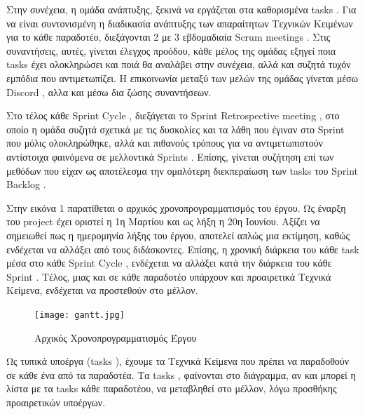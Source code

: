 \documentclass{../ol-softwaremanual}
\begin{document}
	\vspace{5pt}
	
	Στην συνέχεια, η ομάδα ανάπτυξης, ξεκινά να εργάζεται στα καθορισμένα \en tasks \gr .
	Για να είναι συντονισμένη η διαδικασία ανάπτυξης των απαραίτητων Τεχνικών Κειμένων για το κάθε παραδοτέο, διεξάγονται 2 με 3 εβδομαδιαία \en Scrum meetings \gr . Στις συναντήσεις, αυτές, γίνεται έλεγχος προόδου, κάθε μέλος της ομάδας εξηγεί ποια \en tasks \gr έχει ολοκληρώσει και ποιά θα αναλάβει στην συνέχεια, αλλά και συζητά τυχόν εμπόδια που αντιμετωπίζει.
	Η επικοινωνία μεταξύ των μελών της ομάδας γίνεται μέσω \en Discord \gr, αλλα και μέσω δια ζώσης συναντήσεων. \\
	
	\vspace{5pt}
	
	Στο τέλος κάθε \en Sprint Cycle \gr , διεξάγεται το \en Sprint Retrospective meeting \gr , στο οποίο η ομάδα συζητά σχετικά με τις δυσκολίες και τα λάθη που έγιναν στο \en Sprint \gr που μόλις ολοκληρώθηκε, αλλά και πιθανούς τρόπους για να αντιμετωπιστούν αντίστοιχα φαινόμενα σε μελλοντικά \en Sprints \gr . Επίσης, γίνεται συζήτηση επί των μεθόδων που είχαν ως αποτέλεσμα την ομαλότερη διεκπεραίωση των \en tasks \gr του \en Sprint Backlog \gr .
	
	\newpage
	
		
		\flushleft
		
		Στην εικόνα 1 παρατίθεται ο αρχικός χρονοπρογραμματισμός του έργου. Ως έναρξη του \en project \gr έχει οριστεί η 1η Μαρτίου και ως λήξη η 20η Ιουνίου. Αξίζει να σημειωθεί πως η ημερομηνία λήξης του έργου, αποτελεί απλώς μια εκτίμηση, καθώς ενδέχεται να αλλάξει από τους διδάσκοντες. Επίσης, η χρονική διάρκεια του κάθε \en task \gr μέσα στο κάθε \en Sprint Cycle \gr, ενδέχεται να αλλάξει κατά την διάρκεια του κάθε \en Sprint \gr . Τέλος, μιας και σε κάθε παραδοτέο υπάρχουν και προαιρετικά Τεχνικά Κείμενα, ενδέχεται να προστεθούν στο μέλλον.
	
	
		\begin{figure}[htbp!]
			
			\texttt{[image: gantt.jpg]}
			\caption{Αρχικός Χρονοπρογραμματισμός Έργου}
			
			
		\end{figure}
	
		Ως τυπικά υποέργα (\en tasks \gr), έχουμε τα Τεχνικά Κείμενα που πρέπει να παραδοθούν σε κάθε ένα από τα παραδοτέα. Τα \en tasks \gr, φαίνονται στο διάγραμμα, αν και μπορεί η λίστα με τα \en tasks \gr κάθε παραδοτέου, να μεταβληθεί στο μέλλον, λόγω προσθήκης προαιρετικών υποέργων. 
		
\end{document}
